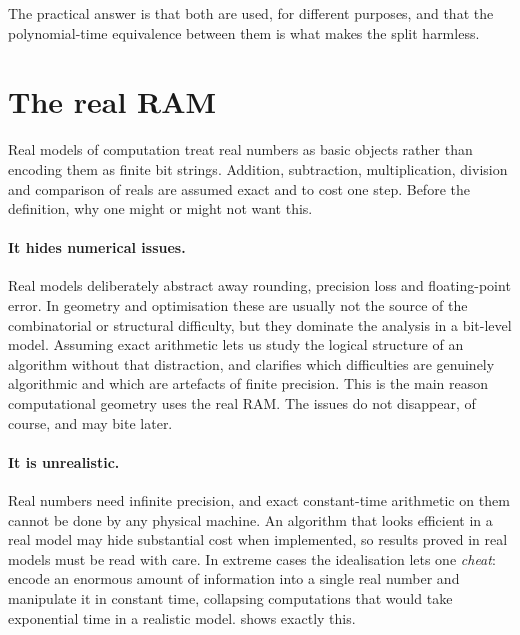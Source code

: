 The practical answer is that both are used, for different purposes, and that
the polynomial-time equivalence between them is what makes the split harmless.

\section{The real RAM}
\label{sec:real-ram}

Real models of computation treat real numbers as basic objects rather than
encoding them as finite bit strings. Addition, subtraction, multiplication,
division and comparison of reals are assumed exact and to cost one step. Before
the definition, why one might or might not want this.

\paragraph{It hides numerical issues.}
Real models deliberately abstract away rounding, precision loss and
floating-point error. In geometry and optimisation these are usually not the
source of the combinatorial or structural difficulty, but they dominate the
analysis in a bit-level model. Assuming exact arithmetic lets us study the
logical structure of an algorithm without that distraction, and clarifies which
difficulties are genuinely algorithmic and which are artefacts of finite
precision. This is the main reason computational geometry uses the real RAM.
The issues do not disappear, of course, and may bite later.

\paragraph{It is unrealistic.}
Real numbers need infinite precision, and exact constant-time arithmetic on
them cannot be done by any physical machine. An algorithm that looks efficient
in a real model may hide substantial cost when implemented, so results proved
in real models must be read with care. In extreme cases the idealisation lets
one \emph{cheat}: encode an enormous amount of information into a single real
number and manipulate it in constant time, collapsing computations that would
take exponential time in a realistic model.  shows
exactly this.

